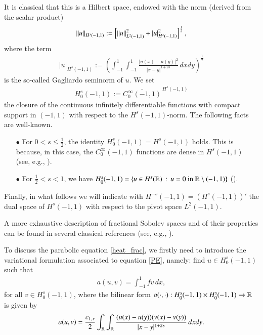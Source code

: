 It is classical that this is a Hilbert space, endowed with the norm (derived from the scalar product)
\begin{align*}
	{\left\|u\right\|}_{H^s(-1,1)} := \left[{\left\|u\right\|}_{L^2(-1,1)}^2 + |u|_{H^s(-1,1)}^2\right]^{\frac 12},
\end{align*}
where the term 
\begin{align*}
	|u|_{H^s(-1,1)}:= \left(\int_{-1}^1\int_{-1}^1 \frac{|u(x)-u(y)|^2}{|x-y|^{1+2s}}\,dxdy\right)^{\frac 12}
\end{align*}
is the so-called Gagliardo seminorm of $u$. We set 
\begin{align*}
H_0^s(-1,1):= \overline{C_0^\infty(-1,1)}^{\,H^s(-1,1)}
\end{align*}
the closure of the continuous infinitely differentiable functions with compact support in $(-1,1)$ with respect to the $H^s(-1,1)$-norm. The following facts are well-known.
\begin{itemize}
	\item[$\bullet$] For $0<s\leq\frac 12$, the identity $H_0^s(-1,1) = H^s(-1,1)$ holds. This is because, in this case, the $C_0^\infty(-1,1)$ functions are dense in $H^s(-1,1)$ (see, e.g., \cite[Theorem 11.1]{jllions1972non}).
	
	\item[$\bullet$] For $\frac 12<s<1$, we have $H_0^s(-1,1)=\left\{ u\in H^s(\mathbb{R})\,:\,u=0\textrm{ in } \mathbb{R}\setminus (-1,1)\right\}$ (\cite{fiscella2015density}).
\end{itemize}

Finally, in what follows we will indicate with $H^{-s}(-1,1)=\left(H^s(-1,1)\right)'$ the dual space of $H^s(-1,1)$ with respect to the pivot space $L^2(-1,1)$.

A more exhaustive description of fractional Sobolev spaces and of their properties can be found in several classical references (see, e.g., \cite{adams2003sobolev,dihitchhiker,jllions1972non}).

To discuss the parabolic equation \eqref{heat_frac}, we firstly need to introduce the variational formulation associated to equation \eqref{PE}, namely: find $u\in H^s_0(-1,1)$ such that
\begin{align*}
a(u,v) = \int_{-1}^1 fv\,dx,	
\end{align*}
for all $v\in H_0^s(-1,1)$, where the bilinear form $a(\cdot,\cdot):H^s_0(-1,1)\times H^s_0(-1,1)\to \mathbb{R}$ is given by
\begin{align}\label{bilinear}
	a(u,v)=\frac{c_{1,s}}{2} \int_{\mathbb{R}}\int_{\mathbb{R}}\frac{(u(x)-u(y))(v(x)-v(y))}{|x-y|^{1+2s}}\,dxdy.	
\end{align}

